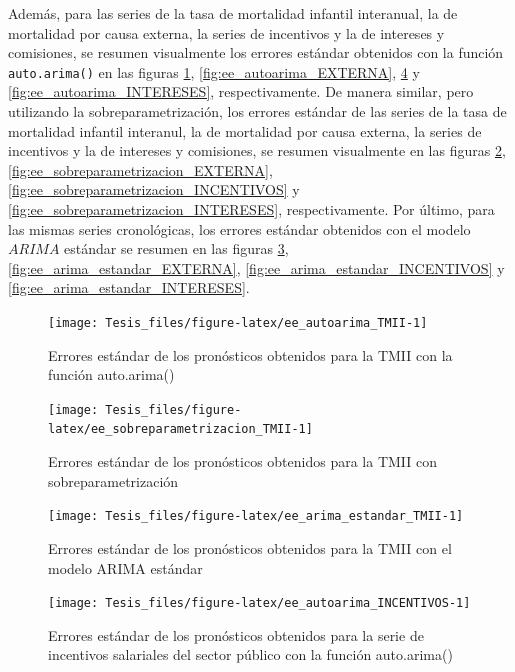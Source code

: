 \documentclass[
]{article}
\begin{document}
Además, para las series de la tasa de mortalidad infantil interanual, la
de mortalidad por causa externa, la series de incentivos y la de
intereses y comisiones, se resumen visualmente los errores estándar
obtenidos con la función \texttt{auto.arima()} en las figuras
\ref{fig:ee_autoarima_TMII}, \ref{fig:ee_autoarima_EXTERNA},
\ref{fig:ee_autoarima_INCENTIVOS} y \ref{fig:ee_autoarima_INTERESES},
respectivamente. De manera similar, pero utilizando la
sobreparametrización, los errores estándar de las series de la tasa de
mortalidad infantil interanul, la de mortalidad por causa externa, la
series de incentivos y la de intereses y comisiones, se resumen
visualmente en las figuras \ref{fig:ee_sobreparametrizacion_TMII},
\ref{fig:ee_sobreparametrizacion_EXTERNA},
\ref{fig:ee_sobreparametrizacion_INCENTIVOS} y
\ref{fig:ee_sobreparametrizacion_INTERESES}, respectivamente. Por
último, para las mismas series cronológicas, los errores estándar
obtenidos con el modelo \(ARIMA\) estándar se resumen en las figuras
\ref{fig:ee_arima_estandar_TMII}, \ref{fig:ee_arima_estandar_EXTERNA},
\ref{fig:ee_arima_estandar_INCENTIVOS} y
\ref{fig:ee_arima_estandar_INTERESES}.

\begin{figure}[H]
\texttt{[image: Tesis\_files/figure-latex/ee\_autoarima\_TMII-1]} \caption{Errores estándar de los pronósticos obtenidos para la TMII con la función auto.arima()}\label{fig:ee_autoarima_TMII}
\end{figure}

\begin{figure}[H]
\texttt{[image: Tesis\_files/figure-latex/ee\_sobreparametrizacion\_TMII-1]} \caption{Errores estándar de los pronósticos obtenidos para la TMII con sobreparametrización}\label{fig:ee_sobreparametrizacion_TMII}
\end{figure}

\begin{figure}[H]
\texttt{[image: Tesis\_files/figure-latex/ee\_arima\_estandar\_TMII-1]} \caption{Errores estándar de los pronósticos obtenidos para la TMII con el modelo ARIMA estándar}\label{fig:ee_arima_estandar_TMII}
\end{figure}

\begin{figure}[H]
\texttt{[image: Tesis\_files/figure-latex/ee\_autoarima\_INCENTIVOS-1]} \caption{Errores estándar de los pronósticos obtenidos para la serie de incentivos salariales del sector público con la función auto.arima()}\label{fig:ee_autoarima_INCENTIVOS}
\end{figure}
\end{document}
